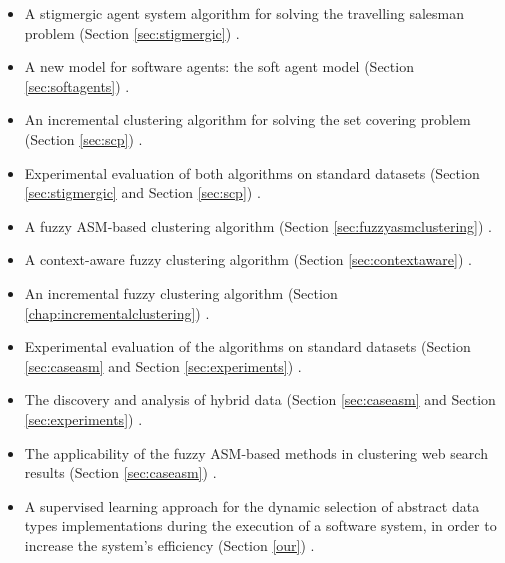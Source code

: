 \begin{itemize}

\item A stigmergic agent system algorithm for solving the travelling salesman problem (Section \ref{sec:stigmergic}) \cite{Chira07Stigmergic}.

\item A new model for software agents: the soft agent model (Section \ref{sec:softagents}) \cite{Gaceanu12SCP}.

\item An incremental clustering algorithm for solving the set covering problem (Section \ref{sec:scp}) \cite{Gaceanu12SCP}.

\item Experimental evaluation of both algorithms on standard datasets (Section \ref{sec:stigmergic} and Section \ref{sec:scp}) \cite{Chira07Stigmergic, Gaceanu12SCP}.


\item A fuzzy ASM-based clustering algorithm (Section \ref{sec:fuzzyasmclustering}) \cite{Gaceanu10AnAdaptive, Gaceanu11ABio}.

\item A context-aware fuzzy clustering algorithm (Section \ref{sec:contextaware}) \cite{Gaceanu11AContext, Gaceanu11AFuzzy}.

\item An incremental fuzzy clustering algorithm (Section \ref{chap:incrementalclustering}) \cite{Gaceanu11AnIncremental}.

\item Experimental evaluation of the algorithms on standard datasets (Section \ref{sec:caseasm} and Section \ref{sec:experiments}) \cite{Gaceanu10AnAdaptive, Gaceanu11ABio, Gaceanu11AContext, Gaceanu11AFuzzy, Gaceanu11AnIncremental}.

\item The discovery and analysis of hybrid data (Section \ref{sec:caseasm} and Section \ref{sec:experiments}) \cite{Gaceanu11AContext, Gaceanu11AFuzzy, Gaceanu11AnIncremental}.

\item The applicability of the fuzzy ASM-based methods in clustering web search results (Section \ref{sec:caseasm}) \cite{Gaceanu10AnAdaptive, Gaceanu11ABio}.


\item A supervised learning approach for the dynamic selection of abstract data types implementations during the execution of a software system, in order to increase the system's efficiency (Section \ref{our}) \cite{Czibula11Intelligent, Czibula12SVM}. 


\end{itemize}
